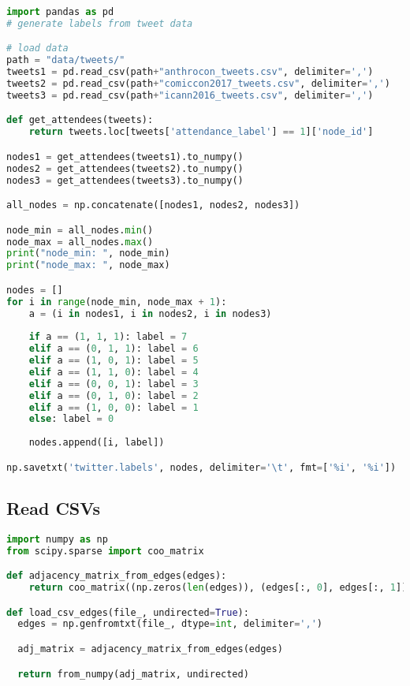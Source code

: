 \documentclass[sigconf]{acmart}
\begin{document}
\begin{lstlisting}[language=python]
import pandas as pd
# generate labels from tweet data

# load data
path = "data/tweets/"
tweets1 = pd.read_csv(path+"anthrocon_tweets.csv", delimiter=',')
tweets2 = pd.read_csv(path+"comiccon2017_tweets.csv", delimiter=',')
tweets3 = pd.read_csv(path+"icann2016_tweets.csv", delimiter=',')

def get_attendees(tweets):
    return tweets.loc[tweets['attendance_label'] == 1]['node_id']

nodes1 = get_attendees(tweets1).to_numpy()
nodes2 = get_attendees(tweets2).to_numpy()
nodes3 = get_attendees(tweets3).to_numpy()

all_nodes = np.concatenate([nodes1, nodes2, nodes3])

node_min = all_nodes.min()
node_max = all_nodes.max()
print("node_min: ", node_min)
print("node_max: ", node_max)

nodes = []
for i in range(node_min, node_max + 1):
    a = (i in nodes1, i in nodes2, i in nodes3)
    
    if a == (1, 1, 1): label = 7
    elif a == (0, 1, 1): label = 6
    elif a == (1, 0, 1): label = 5
    elif a == (1, 1, 0): label = 4
    elif a == (0, 0, 1): label = 3
    elif a == (0, 1, 0): label = 2
    elif a == (1, 0, 0): label = 1
    else: label = 0
    
    nodes.append([i, label])

np.savetxt('twitter.labels', nodes, delimiter='\t', fmt=['%i', '%i'])
\end{lstlisting}

\subsection{Read CSVs} \label{edge_lists}

\begin{lstlisting}[language=python]
import numpy as np
from scipy.sparse import coo_matrix

def adjacency_matrix_from_edges(edges):
    return coo_matrix((np.zeros(len(edges)), (edges[:, 0], edges[:, 1])))

def load_csv_edges(file_, undirected=True):
  edges = np.genfromtxt(file_, dtype=int, delimiter=',')

  adj_matrix = adjacency_matrix_from_edges(edges)

  return from_numpy(adj_matrix, undirected)
\end{lstlisting}
\end{document}
